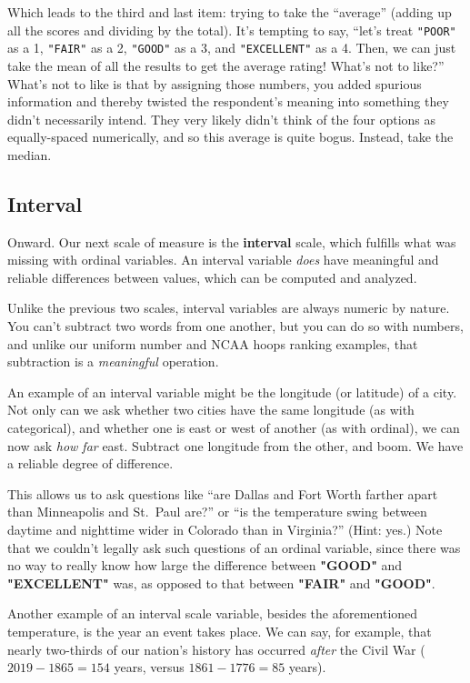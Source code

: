 Which leads to the third and last item: trying to take the ``average'' (adding
up all the scores and dividing by the total). It's tempting to say, ``let's
treat \texttt{"POOR"} as a 1, \texttt{"FAIR"} as a 2, \texttt{"GOOD"} as a 3,
and \texttt{"EXCELLENT"} as a 4. Then, we can just take the mean of all the
results to get the average rating! What's not to like?'' What's not to like is
that by assigning those numbers, you added spurious information and thereby
twisted the respondent's meaning into something they didn't necessarily intend.
They very likely didn't think of the four options as equally-spaced
numerically, and so this average is quite bogus. Instead, take the median.


\subsection{Interval}

Onward. Our next scale of measure is the \textbf{interval} scale, which
fulfills what was missing with ordinal variables. An interval variable
\textit{does} have meaningful and reliable differences between values, which
can be computed and analyzed.

Unlike the previous two scales, interval variables are always numeric by
nature. You can't subtract two words from one another, but you can do so with
numbers, and unlike our uniform number and NCAA hoops ranking examples, that
subtraction is a \textit{meaningful} operation.

An example of an interval variable might be the longitude (or latitude) of a
city. Not only can we ask whether two cities have the same longitude (as with
categorical), and whether one is east or west of another (as with ordinal), we
can now ask \textit{how far} east. Subtract one longitude from the other, and
boom. We have a reliable degree of difference.

This allows us to ask questions like ``are Dallas and Fort Worth farther apart
than Minneapolis and St.~Paul are?'' or ``is the temperature swing between
daytime and nighttime wider in Colorado than in Virginia?'' (Hint: yes.) Note
that we couldn't legally ask such questions of an ordinal variable, since there
was no way to really know how large the difference between \textbf{"GOOD"} and
\textbf{"EXCELLENT"} was, as opposed to that between \textbf{"FAIR"} and
\textbf{"GOOD"}.

Another example of an interval scale variable, besides the aforementioned
temperature, is the year an event takes place. We can say, for example, that
nearly two-thirds of our nation's history has occurred \textit{after} the Civil
War ($2019-1865=154$ years, versus $1861-1776=85$ years).

